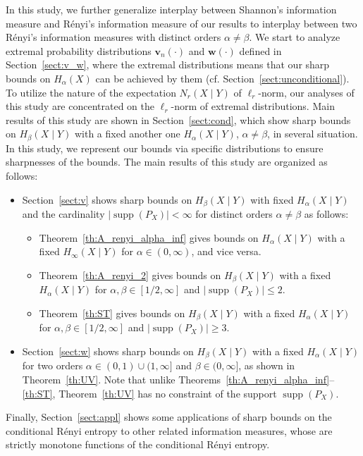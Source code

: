 \documentclass[conference, draftcls, onecolumn]{IEEEtran}
\theoremstyle{plain}
\newcommand{\bvec}[1]{\boldsymbol{#1}}
\newcommand{\supp}{\operatorname{supp}}
\newcommand{\thref}[1]{Theorem~\ref{#1}}
\newcommand{\sectref}[1]{Section~\ref{#1}}
\begin{document}
In this study, we further generalize interplay between Shannon's information measure and R\'{e}nyi's information measure of our results \cite{part1, part2} to interplay between two R\'{e}nyi's information measures with distinct orders $\alpha \neq \beta$.
We start to analyze extremal probability distributions $\bvec{v}_{n}( \cdot )$ and $\bvec{w}( \cdot )$ defined in \sectref{sect:v_w}, where the extremal distributions means that our sharp bounds on $H_{\alpha}(X)$ can be achieved by them (cf. \sectref{sect:unconditional}).
To utilize the nature of the expectation $N_{r}(X \mid Y)$ of $\ell_{r}$-norm, our analyses of this study are concentrated on the $\ell_{r}$-norm of extremal distributions.
Main results of this study are shown in \sectref{sect:cond}, which show sharp bounds on $H_{\beta}(X \mid Y)$ with a fixed another one $H_{\alpha}(X \mid Y)$, $\alpha \neq \beta$, in several situation.
In this study, we represent our bounds via specific distributions to ensure sharpnesses of the bounds.
The main results of this study are organized as follows:
\begin{itemize}
\item
\sectref{sect:v} shows sharp bounds on $H_{\beta}(X \mid Y)$ with fixed $H_{\alpha}(X \mid Y)$ and the cardinality $|\!\supp( P_{X} )| < \infty$ for distinct orders $\alpha \neq \beta$ as follows:
\begin{itemize}
\item
\thref{th:A_renyi_alpha_inf} gives bounds on $H_{\alpha}(X \mid Y)$ with a fixed $H_{\infty}(X \mid Y)$ for $\alpha \in (0, \infty)$, and vice versa.
\item
\thref{th:A_renyi_2} gives bounds on $H_{\beta}(X \mid Y)$ with a fixed $H_{\alpha}(X \mid Y)$ for $\alpha, \beta \in [1/2, \infty]$ and $|\!\supp( P_{X} )| \le 2$.
\item
\thref{th:ST} gives bounds on $H_{\beta}(X \mid Y)$ with a fixed $H_{\alpha}(X \mid Y)$ for $\alpha, \beta \in [1/2, \infty]$ and $|\!\supp( P_{X} )| \ge 3$.
\end{itemize}
\item
\sectref{sect:w} shows sharp bounds on $H_{\beta}(X \mid Y)$ with a fixed $H_{\alpha}(X \mid Y)$ for two orders $\alpha \in (0, 1) \cup (1, \infty]$ and $\beta \in (0, \infty]$, as shown in \thref{th:UV}.
Note that unlike Theorems~\ref{th:A_renyi_alpha_inf}--\ref{th:ST}, \thref{th:UV} has no constraint of the support $\supp( P_{X} )$.
\end{itemize}
Finally, \sectref{sect:appl} shows some applications of sharp bounds on the conditional R\'{e}nyi entropy to other related information measures, whose are strictly monotone functions of the conditional R\'{e}nyi entropy.
\end{document}
